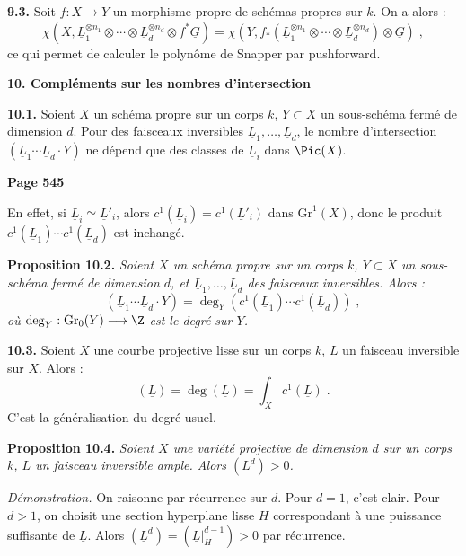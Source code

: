 \smallskip
\noindent\textbf{9.3.} Soit $f : X \longrightarrow Y$ un morphisme propre de sch\'emas propres sur $k$. On a alors :
\[
\chi(X, \underline{L}_1^{\otimes n_1} \otimes \cdots \otimes \underline{L}_d^{\otimes n_d} \otimes f^*\underline{G}) = \chi(Y, f_*(\underline{L}_1^{\otimes n_1} \otimes \cdots \otimes \underline{L}_d^{\otimes n_d}) \otimes \underline{G})\;,
\]
ce qui permet de calculer le polyn\^ome de Snapper par pushforward.

\medskip
\noindent\textbf{10. Compl\'ements sur les nombres d'intersection}

\smallskip
\noindent\textbf{10.1.} Soient $X$ un sch\'ema propre sur un corps $k$, $Y \subset X$ un sous-sch\'ema ferm\'e de dimension $d$. Pour des faisceaux inversibles $\underline{L}_1, \ldots, \underline{L}_d$, le nombre d'intersection $(\underline{L}_1 \cdots \underline{L}_d \cdot Y)$ ne d\'epend que des classes de $\underline{L}_i$ dans $\Pic(X)$.

\newpage
\noindent\textbf{Page 545}

En effet, si $\underline{L}_i \simeq \underline{L}'_i$, alors $c^1(\underline{L}_i) = c^1(\underline{L}'_i)$ dans $\mathrm{Gr}^1(X)$, donc le produit $c^1(\underline{L}_1) \cdots c^1(\underline{L}_d)$ est inchang\'e.

\smallskip
\noindent\textbf{Proposition 10.2.} \textit{Soient $X$ un sch\'ema propre sur un corps $k$, $Y \subset X$ un sous-sch\'ema ferm\'e de dimension $d$, et $\underline{L}_1, \ldots, \underline{L}_d$ des faisceaux inversibles. Alors :
\[
(\underline{L}_1 \cdots \underline{L}_d \cdot Y) = \deg_Y(c^1(\underline{L}_1) \cdots c^1(\underline{L}_d))\;,
\]
o\`u $\deg_Y : \mathrm{Gr}_0(Y) \longrightarrow \Z$ est le degr\'e sur $Y$.}

\smallskip
\noindent\textbf{10.3.} Soient $X$ une courbe projective lisse sur un corps $k$, $\underline{L}$ un faisceau inversible sur $X$. Alors :
\[
(\underline{L}) = \deg(\underline{L}) = \int_X c^1(\underline{L})\;.
\]
C'est la g\'en\'eralisation du degr\'e usuel.

\smallskip
\noindent\textbf{Proposition 10.4.} \textit{Soient $X$ une vari\'et\'e projective de dimension $d$ sur un corps $k$, $\underline{L}$ un faisceau inversible ample. Alors $(\underline{L}^d) > 0$.}

\textit{D\'emonstration.} On raisonne par r\'ecurrence sur $d$. Pour $d = 1$, c'est clair. Pour $d > 1$, on choisit une section hyperplane lisse $H$ correspondant \`a une puissance suffisante de $\underline{L}$. Alors $(\underline{L}^d) = (\underline{L}|_H^{d-1}) > 0$ par r\'ecurrence.

